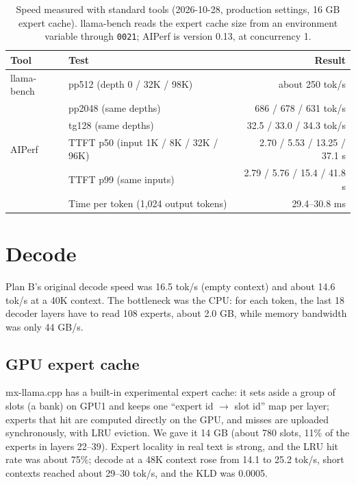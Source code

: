 \documentclass[11pt,a4paper]{article}
\newcommand{\code}[1]{\texttt{#1}}
\newcommand{\tps}{tok/s}
\begin{document}
\begin{table}[h]
  \centering
  \small
  \caption{Speed measured with standard tools (2026-10-28, production settings, 16 GB expert cache). llama-bench reads the expert cache size from an environment variable through \code{0021}; AIPerf is version 0.13, at concurrency 1.}
  \label{tab:stdbench}
  \begin{tabular}{@{}l l r@{}}
    \toprule
    Tool & Test & Result \\
    \midrule
    llama-bench & pp512 (depth 0 / 32K / 98K) & about 250 \tps{} \\
     & pp2048 (same depths) & 686 / 678 / 631 \tps{} \\
     & tg128 (same depths) & 32.5 / 33.0 / 34.3 \tps{} \\
    AIPerf & TTFT p50 (input 1K / 8K / 32K / 96K) & 2.70 / 5.53 / 13.25 / 37.1 s \\
     & TTFT p99 (same inputs) & 2.79 / 5.76 / 15.4 / 41.8 s \\
     & Time per token (1,024 output tokens) & 29.4--30.8 ms \\
    \bottomrule
  \end{tabular}
\end{table}

\section{Decode}
\label{sec:decode}

Plan B's original decode speed was 16.5 \tps{} (empty context) and about 14.6 \tps{} at a 40K context. The bottleneck was the CPU: for each token, the last 18 decoder layers have to read 108 experts, about 2.0 GB, while memory bandwidth was only 44 GB/s.

\subsection{GPU expert cache}

mx-llama.cpp has a built-in experimental expert cache: it sets aside a group of slots (a bank) on GPU1 and keeps one ``expert id $\to$ slot id'' map per layer; experts that hit are computed directly on the GPU, and misses are uploaded synchronously, with LRU eviction. We gave it 14 GB (about 780 slots, 11\% of the experts in layers 22--39). Expert locality in real text is strong, and the LRU hit rate was about 75\%; decode at a 48K context rose from 14.1 to 25.2 \tps{}, short contexts reached about 29--30 \tps{}, and the KLD was 0.0005.
\end{document}
